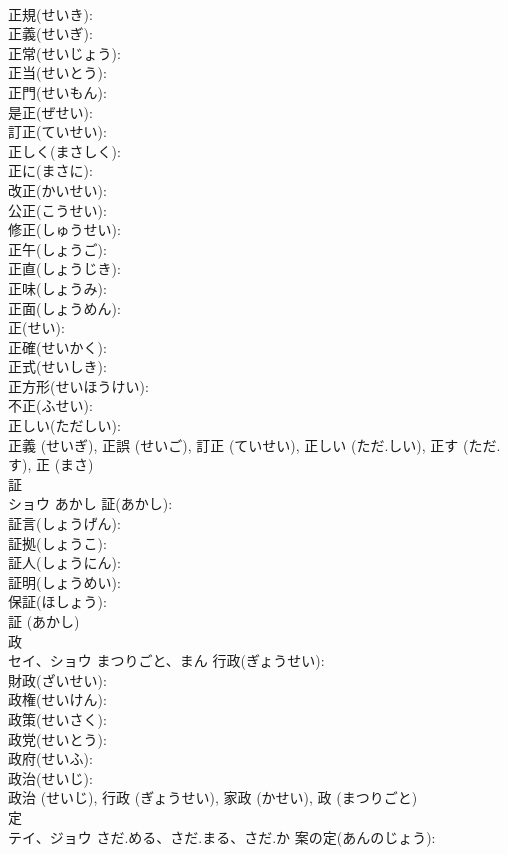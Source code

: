 \documentclass[8pt]{extreport}
\begin{document}
\begin{CJK}{UTF8}{min}
\\	正規(せいき): 
\\	正義(せいぎ): 
\\	正常(せいじょう): 
\\	正当(せいとう): 
\\	正門(せいもん): 
\\	是正(ぜせい): 
\\	訂正(ていせい): 
\\	正しく(まさしく): 
\\	正に(まさに): 
\\	改正(かいせい): 
\\	公正(こうせい): 
\\	修正(しゅうせい): 
\\	正午(しょうご): 
\\	正直(しょうじき): 
\\	正味(しょうみ): 
\\	正面(しょうめん): 
\\	正(せい): 
\\	正確(せいかく): 
\\	正式(せいしき): 
\\	正方形(せいほうけい): 
\\	不正(ふせい): 
\\	正しい(ただしい): 
\\	正義 (せいぎ), 正誤 (せいご), 訂正 (ていせい), 正しい (ただ.しい), 正す (ただ.す), 正 (まさ)
\\	証			
\\	ショウ	あかし	証(あかし): 
\\	証言(しょうげん): 
\\	証拠(しょうこ): 
\\	証人(しょうにん): 
\\	証明(しょうめい): 
\\	保証(ほしょう): 
\\	証 (あかし)
\\	政			
\\	セイ、ショウ	まつりごと、まん	行政(ぎょうせい): 
\\	財政(ざいせい): 
\\	政権(せいけん): 
\\	政策(せいさく): 
\\	政党(せいとう): 
\\	政府(せいふ): 
\\	政治(せいじ): 
\\	政治 (せいじ), 行政 (ぎょうせい), 家政 (かせい), 政 (まつりごと)
\\	定			
\\	テイ、ジョウ	さだ.める、さだ.まる、さだ.か	案の定(あんのじょう): 

\end{CJK}
\end{document}
